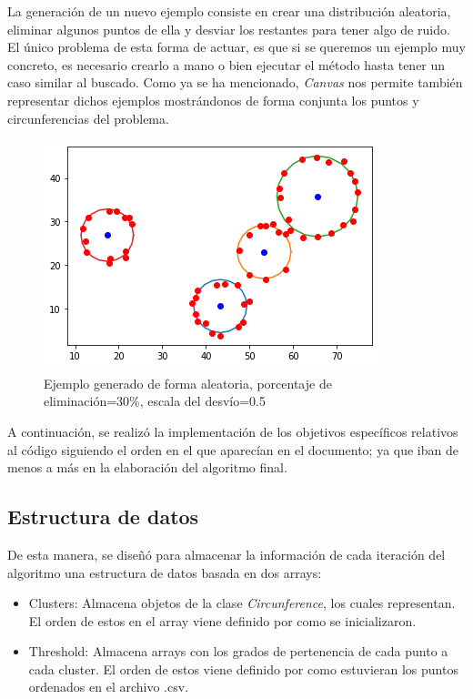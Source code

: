 \documentclass[conference,a4paper]{IEEEtran}
\begin{document}
La generación de un nuevo ejemplo consiste en crear una distribución aleatoria, eliminar algunos puntos de ella y desviar los restantes para tener algo de ruido. El único problema de esta forma de actuar, es que si se queremos un ejemplo muy concreto, es necesario crearlo a mano o bien ejecutar el método hasta tener un caso similar al buscado. Como ya se ha mencionado, \textit{Canvas} nos permite también representar dichos ejemplos mostrándonos de forma conjunta los puntos y circunferencias del problema.

\begin{figure}[H]
\centering
\includegraphics[scale=0.8]{EjemploGenerado}
\caption{Ejemplo generado de forma aleatoria, porcentaje de eliminación=30\%, escala del desvío=0.5}
\end{figure}

A continuación, se realizó la implementación de los objetivos específicos relativos al código siguiendo el orden en el que aparecían en el documento; ya que iban de menos a más en la elaboración del algoritmo final.

\subsection{Estructura de datos}

De esta manera, se diseñó para almacenar la información de cada iteración del algoritmo una estructura de datos basada en dos arrays: 
\begin{itemize}
	\item Clusters: Almacena objetos de la clase \textit{Circunference}, los cuales representan. El orden de estos en el array viene definido por como se inicializaron.
	\item Threshold: Almacena arrays con los grados de pertenencia de cada punto a cada cluster. El orden de estos viene definido por como estuvieran los puntos ordenados en el archivo .csv.
\end{itemize}
\end{document}

